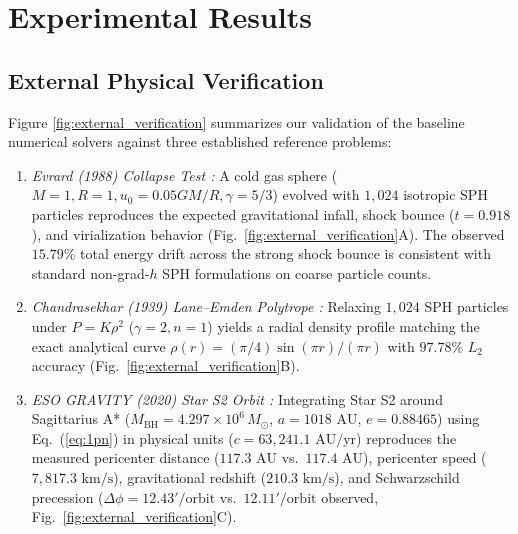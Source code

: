 \documentclass[10pt,twocolumn,letterpaper]{article}
\begin{document}
\section{Experimental Results}

\subsection{External Physical Verification}
Figure \ref{fig:external_verification} summarizes our validation of the baseline numerical solvers against three established reference problems:
\begin{enumerate}
    \item \textit{Evrard (1988) Collapse Test \cite{evrard1988}:} A cold gas sphere ($M=1, R=1, u_0=0.05 GM/R, \gamma=5/3$) evolved with $1,024$ isotropic SPH particles reproduces the expected gravitational infall, shock bounce ($t = 0.918$), and virialization behavior (Fig.\ \ref{fig:external_verification}A). The observed $15.79\%$ total energy drift across the strong shock bounce is consistent with standard non-grad-$h$ SPH formulations on coarse particle counts.
    \item \textit{Chandrasekhar (1939) Lane--Emden Polytrope \cite{chandrasekhar1939}:} Relaxing $1,024$ SPH particles under $P = K\rho^2$ ($\gamma=2, n=1$) yields a radial density profile matching the exact analytical curve $\rho(r) = (\pi/4)\sin(\pi r)/(\pi r)$ with $97.78\%$ $L_2$ accuracy (Fig.\ \ref{fig:external_verification}B).
    \item \textit{ESO GRAVITY (2020) Star S2 Orbit \cite{gravity2020}:} Integrating Star S2 around Sagittarius A* ($M_{\text{BH}} = 4.297\times 10^6\,M_\odot$, $a=1018\text{ AU}$, $e=0.88465$) using Eq.\ (\ref{eq:1pn}) in physical units ($c = 63,241.1\text{ AU/yr}$) reproduces the measured pericenter distance ($117.3\text{ AU}$ vs.\ $117.4\text{ AU}$), pericenter speed ($7,817.3\text{ km/s}$), gravitational redshift ($210.3\text{ km/s}$), and Schwarzschild precession ($\Delta\phi = 12.43'\text{/orbit}$ vs.\ $12.11'\text{/orbit}$ observed, Fig.\ \ref{fig:external_verification}C).
\end{enumerate}
\end{document}
